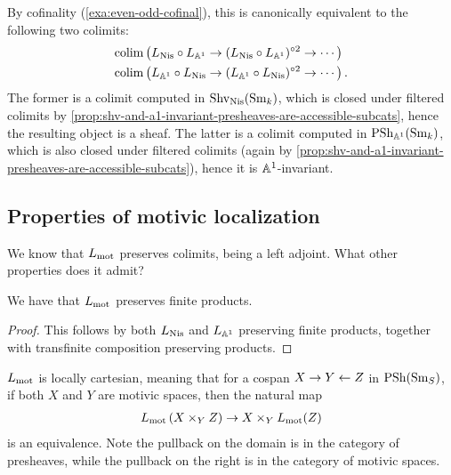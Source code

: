 \documentclass[11pt,openany]{book}
\renewcommand{\Pre}{\mathrm{PSh}}
\begin{document}
\begin{remark}\label{rmk:Lmot-cofinality} 
By cofinality (\autoref{exa:even-odd-cofinal}), this is canonically equivalent to the following two colimits:
\begin{align*}
    &\mathrm{colim} \left( L_{\mathrm{Nis}} \circ L_{\mathbb{A}^1} \to (L_{\mathrm{Nis}} \circ L_{\mathbb{A}^1})^{\circ 2} \to \cdots  \right) \\
    &\mathrm{colim} \left( L_{\mathbb{A}^1}\circ L_{\mathrm{Nis}} \to ( L_{\mathbb{A}^1} \circ L_{\mathrm{Nis}})^{\circ 2} \to \cdots  \right).
\end{align*}
The former is a colimit computed in $\mathrm{Shv}_{\mathrm{Nis}}(\mathrm{Sm}_k)$, which is closed under filtered colimits by \autoref{prop:shv-and-a1-invariant-presheaves-are-accessible-subcats}, hence the resulting object is a sheaf. The latter is a colimit computed in $\Pre_{\A^1}(\Sm_k)$, which is also closed under filtered colimits (again by \autoref{prop:shv-and-a1-invariant-presheaves-are-accessible-subcats}), hence it is $\mathbb{A}^1$-invariant.
\end{remark}


\subsection{Properties of motivic localization}

We know that $L_{\mathrm{mot}}$ preserves colimits, being a left adjoint. What other properties does it admit?

\begin{proposition} \cite[C.6]{Hoyois} We have that $L_{\mathrm{mot}}$ preserves finite products.
\end{proposition}
\begin{proof} This follows by both $L_{\mathrm{Nis}}$ and $L_{\mathbb{A}^1}$ preserving finite products, together with transfinite composition preserving products.
\end{proof}


\begin{proposition} \cite[3.15]{Hoyois6}
$L_{\mathrm{mot}}$ is locally cartesian, meaning that for a cospan $X \to Y \leftarrow Z$ in $\mathrm{PSh}(\mathrm{Sm}_S)$, if both $X$ and $Y$ are motivic spaces, then the natural map
\begin{align*}
    L_{\mathrm{mot}} \left( X \times_Y Z \right) \to X \times_Y L_{\mathrm{mot}}(Z)
\end{align*}
is an equivalence. Note the pullback on the domain is in the category of presheaves, while the pullback on the right is in the category of motivic spaces.
\end{proposition}
\end{document}
